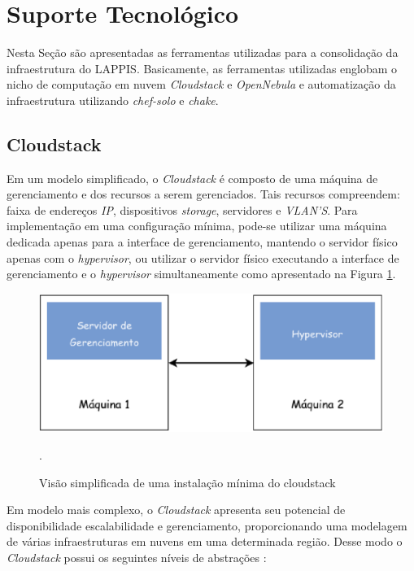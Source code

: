 \section{Suporte Tecnológico}
Nesta Seção são apresentadas as ferramentas utilizadas para a consolidação da infraestrutura do LAPPIS. Basicamente, as ferramentas utilizadas englobam o nicho de computação em nuvem \textit{Cloudstack} e \textit{OpenNebula} e automatização da infraestrutura utilizando \textit{chef-solo} e \textit{chake}.
\subsection{Cloudstack}
\label{sub:subsecao}
Em um modelo simplificado, o \textit{Cloudstack} é composto de uma máquina de gerenciamento e dos recursos a serem gerenciados. Tais recursos compreendem: faixa de endereços \textit{IP}, dispositivos \textit{storage}, servidores e \textit{VLAN'S}. Para implementação em uma configuração mínima, pode-se utilizar uma máquina dedicada apenas para a interface de gerenciamento, mantendo o servidor físico apenas com o \textit{hypervisor}, ou utilizar o servidor físico executando a interface de gerenciamento e o \textit{hypervisor} simultaneamente como apresentado na Figura \ref{cloudstatck_minimal}. 

\begin{figure}[!htb]
\centering
\includegraphics [keepaspectratio=true,scale=0.60]{figuras/cloudstack_minimal.eps}
\caption{Visão simplificada de uma instalação mínima do cloudstack}
\cite{cloudstack}.
\label{cloudstatck_minimal}
\end{figure}

Em modelo mais complexo, o \textit{Cloudstack} apresenta seu potencial de disponibilidade escalabilidade e gerenciamento, proporcionando uma modelagem de várias infraestruturas em nuvens em uma determinada região. Desse modo o \textit{Cloudstack} possui os seguintes níveis de abstrações \cite{shape}:

